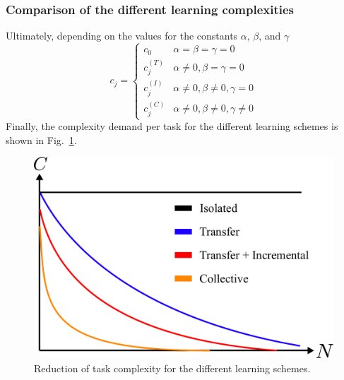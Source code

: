\subsubsection{Comparison of the different learning complexities}
Ultimately, depending on the values for the constants $\alpha$, $\beta$, and $\gamma$
\begin{equation}
c_j =
    \begin{cases} 
      c_0 & \alpha=\beta=\gamma =0 \\
      c^{(T)}_j & \alpha\neq 0, \beta=\gamma =0 \\
      c^{(I)}_j & \alpha\neq 0, \beta \neq 0, \gamma =0 \\
      c^{(C)}_j & \alpha\neq 0, \beta \neq 0, \gamma \neq 0 
   \end{cases}
\end{equation}
Finally, the complexity demand per task for the different learning schemes is shown in Fig.~\ref{fig:learning_schemes}.
\begin{figure}[!t]
	\centering
	\includegraphics[width=1\columnwidth]{fig/complexity_per_tasks.pdf}
	\caption{Reduction of task complexity for the different learning schemes.}
	\label{fig:learning_schemes}
\end{figure}
